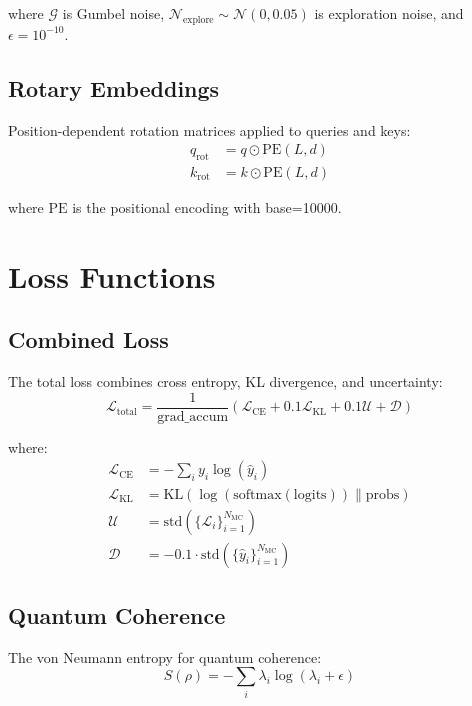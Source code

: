 \documentclass{article}
\begin{document}
where $\mathcal{G}$ is Gumbel noise, $\mathcal{N}_{\text{explore}} \sim \mathcal{N}(0, 0.05)$ is exploration noise, and $\epsilon=10^{-10}$.

\subsection{Rotary Embeddings}
Position-dependent rotation matrices applied to queries and keys:
\begin{equation}
\begin{split}
q_{\text{rot}} &= q \odot \text{PE}(L,d) \\
k_{\text{rot}} &= k \odot \text{PE}(L,d)
\end{split}
\end{equation}

where $\text{PE}$ is the positional encoding with base=10000.

\section{Loss Functions}

\subsection{Combined Loss}
The total loss combines cross entropy, KL divergence, and uncertainty:
\begin{equation}
\mathcal{L}_{\text{total}} = \frac{1}{\text{grad\_accum}}\left(\mathcal{L}_{\text{CE}} + 0.1\mathcal{L}_{\text{KL}} + 0.1\mathcal{U} + \mathcal{D}\right)
\end{equation}

where:
\begin{align*}
\mathcal{L}_{\text{CE}} &= -\sum_{i} y_i \log(\hat{y}_i) \\
\mathcal{L}_{\text{KL}} &= \text{KL}(\log(\text{softmax}(\text{logits})) \| \text{probs}) \\
\mathcal{U} &= \text{std}(\{\mathcal{L}_i\}_{i=1}^{N_{\text{MC}}}) \\
\mathcal{D} &= -0.1 \cdot \text{std}(\{\hat{y}_i\}_{i=1}^{N_{\text{MC}}})
\end{align*}

\subsection{Quantum Coherence}
The von Neumann entropy for quantum coherence:
\begin{equation}
S(\rho) = -\sum_i \lambda_i \log(\lambda_i + \epsilon)
\end{equation}
\end{document}
